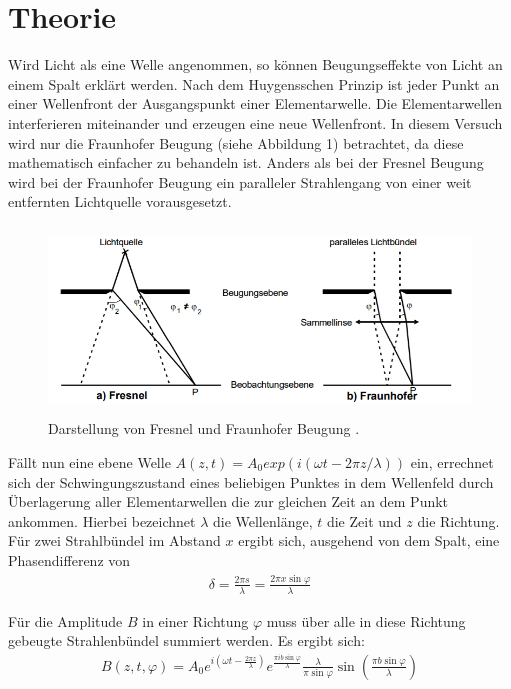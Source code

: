 \section{Theorie}
\label{sec:Theorie}

Wird Licht als eine Welle angenommen, so können Beugungseffekte von Licht an einem Spalt erklärt werden. Nach dem Huygensschen
Prinzip ist jeder Punkt an einer Wellenfront der Ausgangspunkt einer Elementarwelle. Die Elementarwellen interferieren miteinander
und erzeugen eine neue Wellenfront. In diesem Versuch wird nur die Fraunhofer Beugung (siehe Abbildung 1) betrachtet, da diese
mathematisch einfacher zu behandeln ist. Anders als bei der Fresnel Beugung wird bei der Fraunhofer Beugung ein
paralleler Strahlengang von einer weit entfernten Lichtquelle vorausgesetzt.


\begin{figure}[H]
  \centering
  \includegraphics[height=5cm]{fraunhofer.PNG}
  \caption{Darstellung von Fresnel und Fraunhofer Beugung \cite{sample}.}
  \label{fig:biegungbild1}
\end{figure}

Fällt nun eine ebene Welle $A(z, t) = A_0 exp(i(\omega t -2\pi z/\lambda))$ ein, errechnet sich der Schwingungszustand  eines
beliebigen Punktes in dem Wellenfeld durch Überlagerung aller Elementarwellen die zur gleichen Zeit an dem Punkt ankommen. Hierbei bezeichnet
$\lambda$ die Wellenlänge, $t$ die Zeit und $z$ die Richtung.
Für zwei Strahlbündel im Abstand $x$ ergibt sich, ausgehend von dem Spalt, eine Phasendifferenz von
\begin{align}
  \delta = \frac{2\pi s}{\lambda} = \frac{2\pi x \sin{\varphi}}{\lambda}
\end{align}

Für die Amplitude $B$ in einer Richtung $\varphi$ muss über alle in diese Richtung gebeugte Strahlenbündel summiert werden. Es ergibt sich:
\begin{align}
  B(z,t, \varphi) = A_0 e^{i \left(\omega t - \frac{2\pi z}{\lambda} \right)} e^{\frac{\pi i b \sin{\varphi}}{\lambda}} \frac{\lambda}{\pi \sin{\varphi}}
  \sin{\left(\frac{\pi b \sin{\varphi}}{\lambda}\right)}
\end{align}


